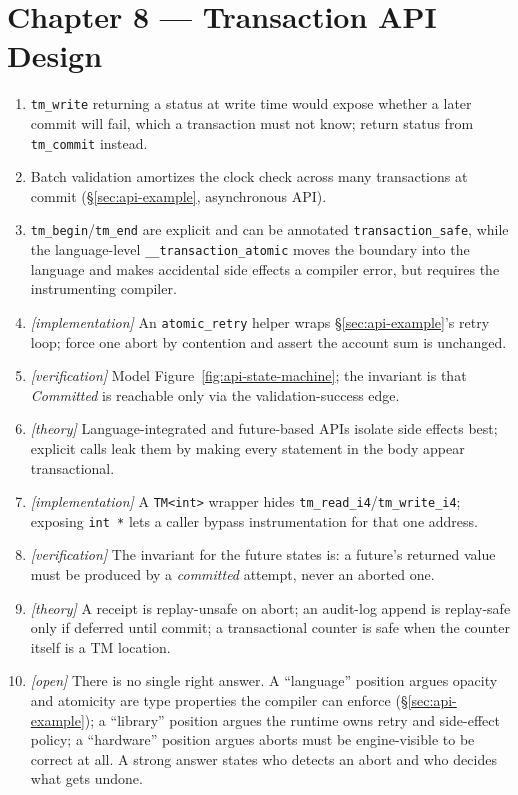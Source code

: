 \section*{Chapter 8 --- Transaction API Design}

\begin{enumerate}
    \item \texttt{tm\_write} returning a status at write time would expose
          whether a later commit will fail, which a transaction must not
          know; return status from \texttt{tm\_commit} instead.
    \item Batch validation amortizes the clock check across many
          transactions at commit (\S\ref{sec:api-example}, asynchronous
          API).
    \item \texttt{tm\_begin}/\texttt{tm\_end} are explicit and can be
          annotated \texttt{transaction\_safe}, while the language-level
          \texttt{\_\_transaction\_\allowbreak atomic}
          moves the boundary into the language and makes accidental
          side effects a compiler error, but requires the instrumenting
          compiler.
    \item \emph{[implementation]} An \texttt{atomic\_retry} helper wraps
          \S\ref{sec:api-example}'s retry loop; force one abort by
          contention and assert the account sum is unchanged.
    \item \emph{[verification]} Model Figure~\ref{fig:api-state-machine};
          the invariant is that \emph{Committed} is reachable only via the
          validation-success edge.
    \item \emph{[theory]} Language-integrated and future-based APIs isolate
          side effects best; explicit calls leak them by making every
          statement in the body appear transactional.
    \item \emph{[implementation]} A \texttt{TM<int>} wrapper hides
          \texttt{tm\_read\_i4}/\texttt{tm\_write\_i4}; exposing \texttt{int
          *} lets a caller bypass instrumentation for that one address.
    \item \emph{[verification]} The invariant for the future states is:
          a future's returned value must be produced by a \emph{committed}
          attempt, never an aborted one.
    \item \emph{[theory]} A receipt is replay-unsafe on abort; an audit-log
          append is replay-safe only if deferred until commit; a
          transactional counter is safe when the counter itself is a TM
          location.
    \item \emph{[open]} There is no single right answer.  A ``language''
          position argues opacity and atomicity are type properties the
          compiler can enforce (\S\ref{sec:api-example}); a ``library''
          position argues the runtime owns retry and side-effect policy; a
          ``hardware'' position argues aborts must be engine-visible to be
          correct at all.  A strong answer states who detects an abort and
          who decides what gets undone.
\end{enumerate}

